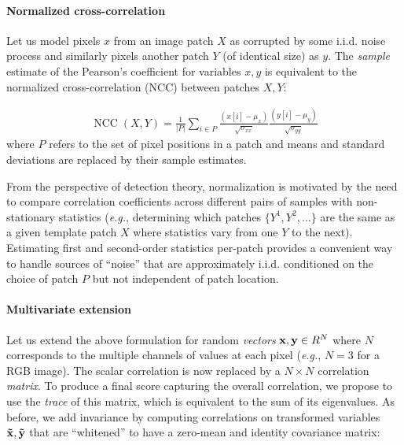 \documentclass[twocolumn]{svjour3}           %
\newcommand{\eg}{\emph{e.g.}}
\begin{document}
\paragraph{Normalized cross-correlation}  Let us model pixels $x$ from an image
patch $X$ as corrupted by some i.i.d. noise process and similarly pixels another
patch $Y$ (of identical size) as $y$.  The {\em sample} estimate of the
Pearson's coefficient for variables $x,y$ is equivalent to the normalized
cross-correlation (NCC) between patches $X,Y$:

{
\begin{align}
  \operatorname{NCC}(X,Y) = \frac{1}{|P|}\sum_{i \in P}
                            \frac{(x[i] - \mu_x)}{\sqrt{\sigma_{xx}}}
                            \frac{(y[i] - \mu_y)}{\sqrt{\sigma_{yy}}}
\end{align}}
where $P$ refers to the set of pixel positions in a patch and means and
standard deviations are replaced by their sample estimates.

From the perspective of detection theory, normalization is motivated by the
need to compare correlation coefficients across different pairs of samples with
non-stationary statistics (\eg, determining which patches $\{Y^1,Y^2,\ldots\}$
are the same as a given template patch $X$ where statistics vary from one $Y$
to the next). Estimating first and second-order statistics per-patch provides a
convenient way to handle sources of ``noise'' that are approximately i.i.d.
conditioned on the choice of patch $P$ but not independent of patch location.

\paragraph{Multivariate extension} Let us extend the above formulation for random
{\em vectors} ${\bf x}, {\bf y} \in R^N$ where $N$ corresponds to the
multiple channels of values at each pixel (\eg, $N=3$ for a RGB image). The
scalar correlation is now replaced by a $N \times N$ correlation {\em matrix}.
To produce a final score capturing the overall correlation, we propose to
use the {\em trace} of this matrix, which is equivalent to the sum of its
eigenvalues. As before, we add invariance by computing correlations on
transformed variables ${\bf \tilde{x},\tilde{y}}$ that are ``whitened'' to have
a zero-mean and identity covariance matrix:
\end{document}
